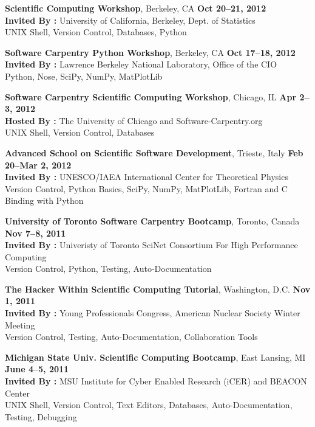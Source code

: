 \documentclass[margin,line]{resume}
\begin{document}
\begin{resume}
    \textbf{Scientific Computing Workshop}, Berkeley, CA \hfill \textbf{Oct 20--21, 2012}\\
               \textbf{Invited By : } University of California, Berkeley, Dept. of Statistics\\
               UNIX Shell, Version Control, Databases, Python

    \textbf{Software Carpentry Python Workshop}, Berkeley, CA \hfill \textbf{Oct 17--18, 2012}\\
               \textbf{Invited By : } Lawrence Berkeley National Laboratory, Office of the CIO\\
               Python, Nose, SciPy, NumPy, MatPlotLib

    \textbf{Software Carpentry Scientific Computing Workshop}, Chicago, IL \hfill \textbf{Apr 2--3, 2012}\\
               \textbf{Hosted By : } The University of Chicago and Software-Carpentry.org \\
               UNIX Shell, Version Control, Databases

    \textbf{Advanced School on Scientific Software Development}, Trieste, Italy \hfill \textbf{Feb 20--Mar 2, 2012}\\
               \textbf{Invited By : } UNESCO/IAEA International Center for Theoretical Physics\\
               Version Control, Python Basics, SciPy, NumPy, MatPlotLib, Fortran and C Binding with Python

    \textbf{University of Toronto Software Carpentry Bootcamp}, Toronto, Canada \hfill \textbf{Nov 7--8, 2011}\\
               \textbf{Invited By : } Univeristy of Toronto SciNet Consortium For High Performance Computing\\
               Version Control, Python, Testing, Auto-Documentation

    \textbf{The Hacker Within Scientific Computing Tutorial}, Washington, D.C.  \hfill \textbf{Nov 1, 2011}\\
               \textbf{Invited By : } Young Professionals Congress, American Nuclear Society Winter Meeting\\
               Version Control, Testing, Auto-Documentation, Collaboration Tools

    \textbf{Michigan State Univ. Scientific Computing Bootcamp}, East Lansing, MI \hfill \textbf{June 4--5, 2011}\\
               \textbf{Invited By : } MSU Institute for Cyber Enabled Research (iCER) and BEACON Center\\
               UNIX Shell, Version Control, Text Editors, Databases, Auto-Documentation, Testing, Debugging


\end{resume}
\end{document}
